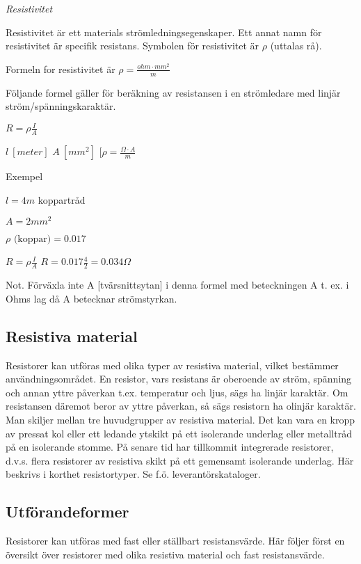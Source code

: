 \emph{Resistivitet}

Resistivitet är ett materials strömledningsegenskaper. Ett annat namn för resistivitet
är specifik resistans. Symbolen för resistivitet är \(\rho\) (uttalas rå).

Formeln for resistivitet är \(\rho = \frac{ohm \cdot mm^2}{m}\)

Följande formel gäller för beräkning av resistansen i en strömledare med
linjär ström/spänningskaraktär.

\(R = \rho \frac{I}{A} \)

\(l\ [meter]\) \(A\ [mm^2]\) \([\rho = \frac{\Omega \cdot A}{m} \)

Exempel

\(l = 4 m\) koppartråd

\(A = 2 mm^2\)

\(\rho \text{ (koppar)} = 0.017\)

\(R = \rho \frac{I}{A}\) \(R = 0.017 \frac{4}{2} = 0.034 \Omega\)

Not. Förväxla inte A [tvärsnittsytan] i denna
formel med beteckningen A t. ex. i Ohms lag då A
betecknar strömstyrkan.

\subsection{Resistiva material}

Resistorer kan utföras med olika typer av
resistiva material, vilket bestämmer användningsområdet.
En resistor, vars resistans är oberoende
av ström, spänning och annan yttre påverkan t.ex. temperatur och ljus, sägs ha linjär
karaktär. Om resistansen däremot beror av
yttre påverkan, så sägs resistorn ha olinjär
karaktär.
Man skiljer mellan tre huvudgrupper av
resistiva material. Det kan vara en kropp av
pressat kol eller ett ledande ytskikt på ett
isolerande underlag eller metalltråd på en
isolerande stomme. På senare tid har tillkommit integrerade resistorer, d.v.s. flera
resistorer av resistiva skikt på ett gemensamt isolerande underlag. Här beskrivs i
korthet
resistortyper. Se f.ö. leverantörskataloger.

\subsection{Utförandeformer}

Resistorer kan utföras med fast eller ställbart resistansvärde. Här följer först en översikt över resistorer med olika resistiva material och fast resistansvärde.

